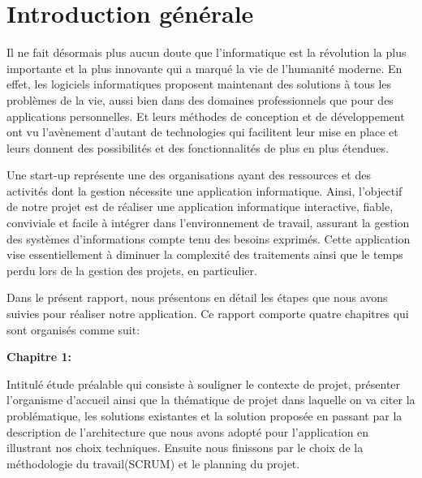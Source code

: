 






\chapter*{Introduction g\'{e}n\'{e}rale}


Il ne fait d\'{e}sormais plus aucun doute que l'informatique est la r\'{e}volution la
plus importante et la plus innovante qui a marqu\'{e} la vie de l'humanit\'{e}
moderne. En effet, les logiciels informatiques proposent maintenant des
solutions \`{a} tous les probl\`{e}mes de la vie, aussi bien dans des domaines
professionnels que pour des applications personnelles. Et leurs m\'{e}thodes de
conception et de d\'{e}veloppement ont vu l'av\`{e}nement d'autant de technologies
qui facilitent leur mise en place et leurs donnent des possibilit\'{e}s et des
fonctionnalit\'{e}s de plus en plus \'{e}tendues.


\bigskip
Une start-up repr\'{e}sente une des organisations ayant des ressources et des
activit\'{e}s dont la gestion n\'{e}cessite une application informatique. Ainsi,
l'objectif de notre projet est de r\'{e}aliser une application informatique
interactive, fiable, conviviale et facile \`{a} int\'{e}grer dans l'environnement de
travail, assurant la gestion des syst\`{e}mes d'informations compte tenu des
besoins exprim\'{e}s. Cette application vise essentiellement \`{a} diminuer la
complexit\'{e} des traitements ainsi que le temps perdu lors de la gestion des
projets, en particulier.

\bigskip


Dans le pr\'{e}sent rapport, nous pr\'{e}sentons en d\'{e}tail les \'{e}tapes que nous avons
suivies pour r\'{e}aliser notre application. Ce rapport comporte quatre chapitres
qui sont organis\'{e}s comme suit:

\bigskip
\textbf{Chapitre 1:}

Intitul\'{e} \'{e}tude pr\'{e}alable qui consiste \`{a} souligner le contexte de projet,
pr\'{e}senter l'organisme d'accueil ainsi que la th\'{e}matique de projet dans
laquelle on va citer la probl\'{e}matique, les solutions existantes et la solution
propos\'{e}e en passant par la description de l'architecture que nous avons adopt\'{e} pour
l'application en illustrant nos choix techniques. Ensuite nous finissons
par le choix de la méthodologie du travail(SCRUM)  et le planning du projet.

